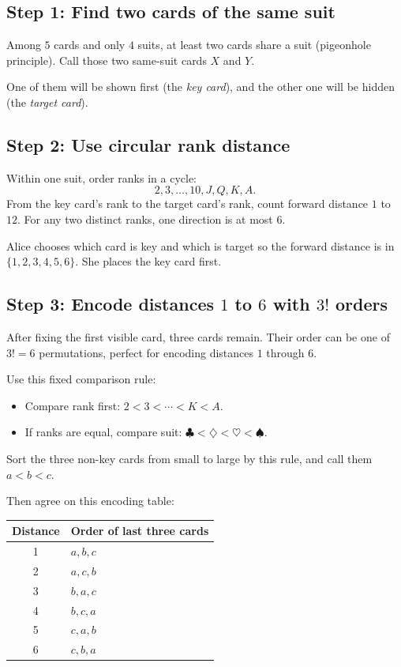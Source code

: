 \subsection*{Step 1: Find two cards of the same suit}
Among \(5\) cards and only \(4\) suits, at least two cards share a suit
(pigeonhole principle). Call those two same-suit cards \(X\) and \(Y\).

One of them will be shown first (the \emph{key card}), and the other one will
be hidden (the \emph{target card}).

\subsection*{Step 2: Use circular rank distance}
Within one suit, order ranks in a cycle:
\[
2,3,\dots,10,J,Q,K,A.
\]
From the key card's rank to the target card's rank, count forward distance
\(1\) to \(12\). For any two distinct ranks, one direction is at most \(6\).

Alice chooses which card is key and which is target so the forward distance is
in \(\{1,2,3,4,5,6\}\). She places the key card first.

\subsection*{Step 3: Encode distances \(1\) to \(6\) with \(3!\) orders}
After fixing the first visible card, three cards remain. Their order can be one
of \(3!=6\) permutations, perfect for encoding distances \(1\) through \(6\).

Use this fixed comparison rule:
\begin{itemize}
  \item Compare rank first: \(2<3<\cdots<K<A\).
  \item If ranks are equal, compare suit:
  \(\clubsuit<\diamondsuit<\heartsuit<\spadesuit\).
\end{itemize}
Sort the three non-key cards from small to large by this rule, and call them
\(a<b<c\).

Then agree on this encoding table:
\begin{center}
\begin{tabular}{c l}
\hline
\textbf{Distance} & \textbf{Order of last three cards} \\
\hline
1 & \(a,b,c\) \\
2 & \(a,c,b\) \\
3 & \(b,a,c\) \\
4 & \(b,c,a\) \\
5 & \(c,a,b\) \\
6 & \(c,b,a\) \\
\hline
\end{tabular}
\end{center}

